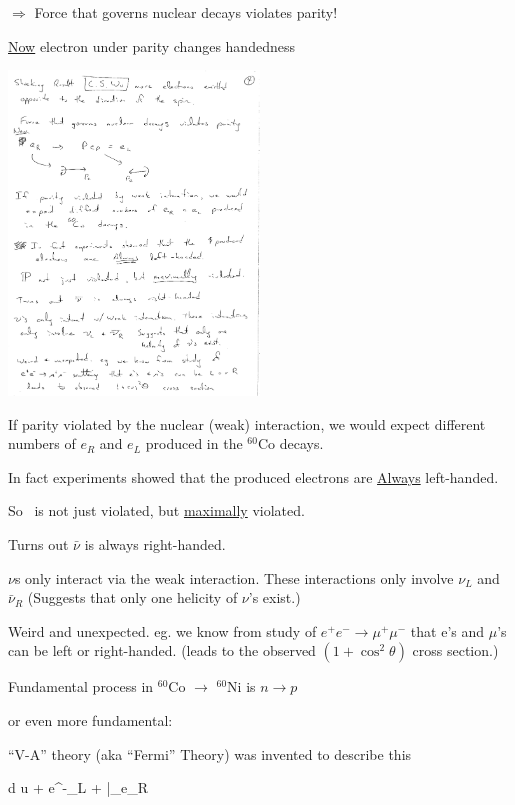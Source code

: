 {$\Rightarrow$ Force that governs nuclear decays violates parity!

\underline{Now} electron under parity changes handedness

\bc
\includegraphics[width=0.5\textwidth]{./ElectronUnderPartity.pdf}
\ec


If parity violated by the nuclear (weak) interaction, we would expect different numbers of $e_R$ and $e_L$ produced in the $^{60}$Co decays.


In fact experiments showed that the produced electrons are \underline{Always} left-handed.


So \parity\ is not just violated, but \underline{maximally} violated.


Turns out $\bar{\nu}$ is always right-handed.


$\nu$s only interact via the weak interaction.  
These interactions only involve $\nu_L$ and $\bar{\nu}_R$
(Suggests that only one helicity of $\nu$'s exist.)


Weird and unexpected. 
eg. we know from study of $e^+e^-\rightarrow \mu^+\mu^-$ that e's and $\mu$'s can be left or right-handed. 
(leads to the observed $(1+\cos^2 \theta)$ cross section.)

\lineacross

Fundamental process in  $^{60}$Co $\rightarrow$  $^{60}$Ni is $n \rightarrow p$

or even more fundamental:


``V-A'' theory (aka ``Fermi'' Theory) was invented to describe this 

\be
d \rightarrow u + e^-_L + \bar{\nu_e}_R
\ee



}
